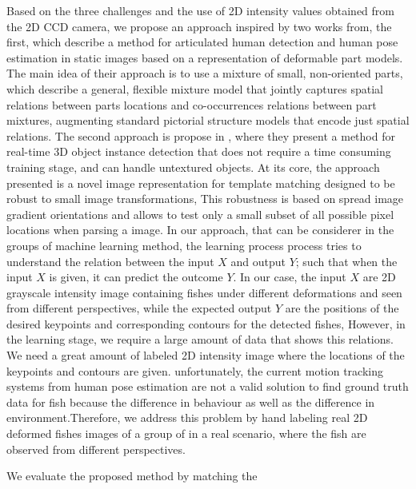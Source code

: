 Based on the three challenges and the use of 2D intensity values obtained from the
2D CCD camera, we propose an approach inspired by two works from, the first, 
\citet{Mixtures-of-parts} which describe a method for articulated human detection
and human pose estimation in static images based on a representation of deformable 
part models. The main idea of their approach is to use a mixture of small, non-oriented 
parts, which describe a general, flexible mixture model that jointly captures spatial 
relations between parts locations and co-occurrences relations between part mixtures, 
augmenting standard pictorial structure models that encode just spatial relations. 
The second approach is propose in \citet{Hinterstoisser2012}, where they present 
a method for real-time 3D object instance detection that does not require a time 
consuming training stage, and can handle untextured objects. At its core, the approach 
presented is a novel image representation for template matching designed to be robust 
to small image transformations, This robustness is based on spread image gradient 
orientations and allows to test only a small subset of all possible pixel locations 
when parsing a image.
In our approach, that can be considerer in the groups of machine learning method, 
the learning process process tries to understand the relation between the input $X$
and output $Y$; such that when the input $X$ is given, it can predict the outcome $Y$.
In our case, the input $X$ are 2D grayscale intensity image containing fishes under
different deformations and seen from different perspectives, while the expected output
$Y$ are the positions of the desired keypoints and corresponding contours for the detected
fishes, However, in the learning stage, we require a large amount of data that shows
this relations. We need a great amount of labeled 2D intensity image where the locations
of the keypoints and contours are given. unfortunately, the current motion tracking systems
from human pose estimation are not a valid solution to find ground truth data for fish
because the difference in behaviour as well as the difference in environment.Therefore,
we address this problem by hand labeling real 2D deformed fishes images of a group of in a real
scenario, where the fish are observed from different perspectives.



We evaluate the proposed method by matching the 


